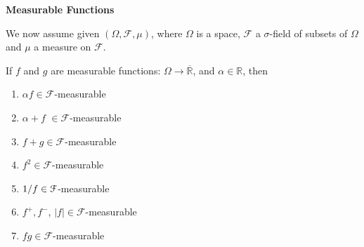 \setcounter{lecture}{11}
\begin{center}
	\Large \bf Measurable Functions
\end{center}
\vspace{0.25cm}

We now assume given $\left( {\Omega ,\mathcal{F},\mu } \right)$, where $ \Omega $ is a space, $ \mathcal{F} $ a $ \sigma $-field of subsets of $ \Omega $ and $ \mu $ a measure on $ \mathcal{F} $.

 \begin{lemma}
 	If $ f $ and $ g $ are measurable functions: $\Omega  \to \overline {\mathbb{R}} $, and $ \alpha \in \mathbb{R} $, then
 	\begin{enumerate}
 		\item $ \alpha f \in \mathcal{F} $-measurable
 		\item $ \alpha + f  $ $\in \mathcal{F} $-measurable
 		\item $ f + g \in \mathcal{F} $-measurable
 		\item $f^{2} \in \mathcal{F} $-measurable
 		\item ${1 \mathord{\left/
 				{\vphantom {1 f}} \right.
 				\kern-\nulldelimiterspace} f}\in \mathcal{F} $-measurable
 		\item $ f^{+},f^{-} $, $\left| f \right| \in \mathcal{F} $-measurable
 		\item $ fg \in \mathcal{F} $-measurable
 	\end{enumerate}
 \label{lma11.1}
 \end{lemma}
